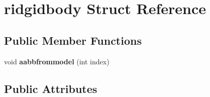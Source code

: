 \hypertarget{structridgidbody}{}\section{ridgidbody Struct Reference}
\label{structridgidbody}
\subsection*{Public Member Functions}
\begin{DoxyCompactItemize}
\item 
\mbox{\label{structridgidbody_a8604d4de6e588466e56d3e09f20e8baa}} 
void {\bfseries aabbfrommodel} (int index)
\end{DoxyCompactItemize}
\subsection*{Public Attributes}
